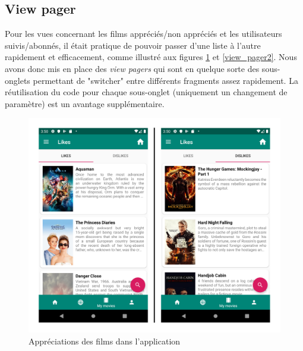 \subsection{View pager}

Pour les vues concernant les films appréciés/non appréciés et les utilisateurs suivis/abonnés, il était pratique de pouvoir passer d'une liste à l'autre rapidement et efficacement, comme illustré aux figures \ref{view_pager1} et \ref{view_pager2}. Nous avons donc mis en place des \textit{view pagers} qui sont en quelque sorte des sous-onglets permettant de "switcher" entre différents fragments assez rapidement. La réutilisation du code pour chaque sous-onglet (uniquement un changement de paramètre) est un avantage supplémentaire.
\begin{figure}
    \begin{center}
        \includegraphics[width=1\textwidth]{img/screenshots/ViewPager1.png}
    \end{center}
    \caption{Appréciations des films dans l'application}
    \label{view_pager1}
\end{figure}

